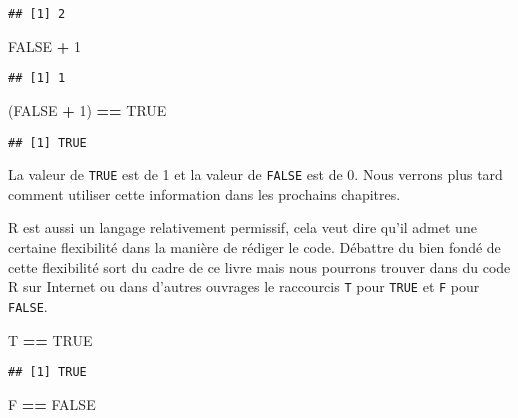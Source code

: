 \documentclass[]{book}
\newenvironment{Shaded}{\begin{snugshade}}{\end{snugshade}}
\newcommand{\DecValTok}[1]{\textcolor[rgb]{0.00,0.00,0.81}{#1}}
\newcommand{\StringTok}[1]{\textcolor[rgb]{0.31,0.60,0.02}{#1}}
\newcommand{\OtherTok}[1]{\textcolor[rgb]{0.56,0.35,0.01}{#1}}
\newcommand{\OperatorTok}[1]{\textcolor[rgb]{0.81,0.36,0.00}{\textbf{#1}}}
\newcommand{\NormalTok}[1]{#1}
\theoremstyle{definition}
\theoremstyle{definition}
\theoremstyle{definition}
\theoremstyle{remark}
\begin{document}
\begin{verbatim}
## [1] 2
\end{verbatim}

\begin{Shaded}
\begin{Highlighting}[]
\OtherTok{FALSE} \OperatorTok{+}\StringTok{ }\DecValTok{1}
\end{Highlighting}
\end{Shaded}

\begin{verbatim}
## [1] 1
\end{verbatim}

\begin{Shaded}
\begin{Highlighting}[]
\NormalTok{(}\OtherTok{FALSE} \OperatorTok{+}\StringTok{ }\DecValTok{1}\NormalTok{) }\OperatorTok{==}\StringTok{ }\OtherTok{TRUE}
\end{Highlighting}
\end{Shaded}

\begin{verbatim}
## [1] TRUE
\end{verbatim}

La valeur de \texttt{TRUE} est de 1 et la valeur de \texttt{FALSE} est
de 0. Nous verrons plus tard comment utiliser cette information dans les
prochains chapitres.

R est aussi un langage relativement permissif, cela veut dire qu'il
admet une certaine flexibilité dans la manière de rédiger le code.
Débattre du bien fondé de cette flexibilité sort du cadre de ce livre
mais nous pourrons trouver dans du code R sur Internet ou dans d'autres
ouvrages le raccourcis \texttt{T} pour \texttt{TRUE} et \texttt{F} pour
\texttt{FALSE}.

\begin{Shaded}
\begin{Highlighting}[]
\NormalTok{T }\OperatorTok{==}\StringTok{ }\OtherTok{TRUE}
\end{Highlighting}
\end{Shaded}

\begin{verbatim}
## [1] TRUE
\end{verbatim}

\begin{Shaded}
\begin{Highlighting}[]
\NormalTok{F }\OperatorTok{==}\StringTok{ }\OtherTok{FALSE}
\end{Highlighting}
\end{Shaded}
\end{document}
